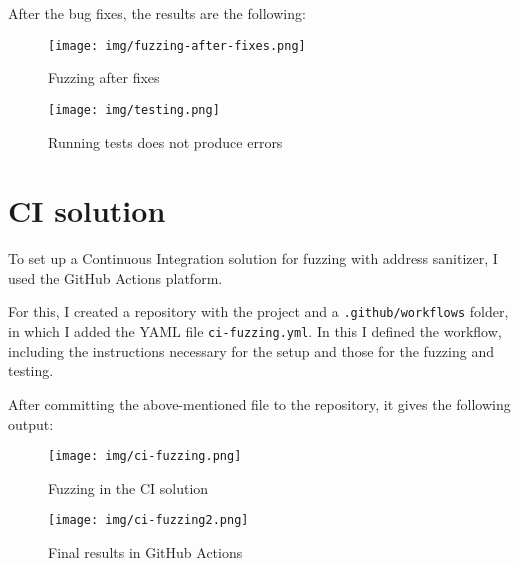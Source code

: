 \documentclass{article}
\begin{document}
After the bug fixes, the results are the following:

\begin{figure}[H]
    \centering
    \texttt{[image: img/fuzzing-after-fixes.png]}
    \caption{Fuzzing after fixes}
    \label{fig:fuzzing-after-fixes}
\end{figure}

\begin{figure}[H]
    \centering
    \texttt{[image: img/testing.png]}
    \caption{Running tests does not produce errors}
    \label{fig:testing}
\end{figure}

\section{CI solution}
To set up a Continuous Integration solution for fuzzing with address sanitizer, I used the GitHub Actions platform.

For this, I created a repository with the project and a \texttt{.github/workflows} folder, in which I added the YAML file \texttt{ci-fuzzing.yml}. In this I defined the workflow, including the instructions necessary for the setup and those for the fuzzing and testing.

After committing the above-mentioned file to the repository, it gives the following output:

\begin{figure}[H]
    \centering
    \texttt{[image: img/ci-fuzzing.png]}
    \caption{Fuzzing in the CI solution}
    \label{fig:ci-fuzzing}
\end{figure}

\begin{figure}[H]
    \centering
    \texttt{[image: img/ci-fuzzing2.png]}
    \caption{Final results in GitHub Actions}
    \label{fig:ci-fuzzing2}
\end{figure}
\end{document}
